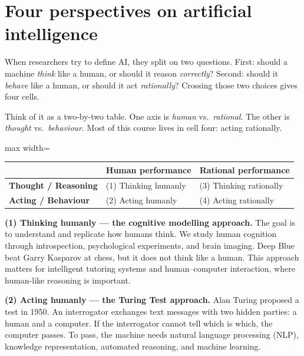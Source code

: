 \documentclass[a4paper,11pt]{article}
\begin{document}
\section{Four perspectives on artificial intelligence}

When researchers try to define AI, they split on two questions.
First: should a machine \emph{think} like a human, or should it reason
\emph{correctly}? Second: should it \emph{behave} like a human, or should it
act \emph{rationally}? Crossing those two choices gives four cells.

\begin{intuition}
Think of it as a two-by-two table. One axis is \emph{human} vs.\ \emph{rational}.
The other is \emph{thought} vs.\ \emph{behaviour}.
Most of this course lives in cell four: acting rationally.
\end{intuition}

\medskip
\begin{adjustbox}{max width=\linewidth}
\begin{tabular}{@{}lll@{}}
\toprule
 & \textbf{Human performance} & \textbf{Rational performance} \\
\midrule
\textbf{Thought / Reasoning} & (1) Thinking humanly & (3) Thinking rationally \\
\textbf{Acting / Behaviour}  & (2) Acting humanly  & (4) Acting rationally \\
\bottomrule
\end{tabular}
\end{adjustbox}
\medskip

\textbf{(1) Thinking humanly --- the cognitive modelling approach.}
The goal is to understand and replicate how humans think.
We study human cognition through introspection, psychological experiments,
and brain imaging.
Deep Blue beat Garry Kasparov at chess, but it does not think like a human.
This approach matters for intelligent tutoring systems and human--computer
interaction, where human-like reasoning is important.

\textbf{(2) Acting humanly --- the Turing Test approach.}
Alan Turing proposed a test in 1950.
An interrogator exchanges text messages with two hidden parties: a human
and a computer.
If the interrogator cannot tell which is which, the computer passes.
To pass, the machine needs natural language processing (NLP), knowledge
representation, automated reasoning, and machine learning.
\end{document}

